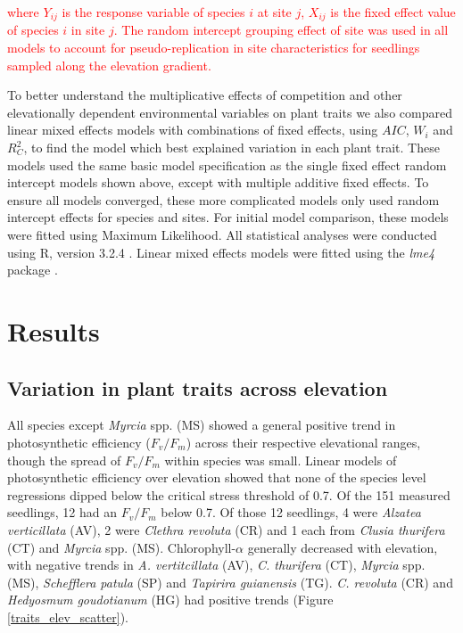 \documentclass[a4paper, 11pt]{article}
\newcommand{\todo}[1]{\textcolor{red}{#1}}   %
\begin{document}
\todo{where $Y_{ij}$ is the response variable of species $i$ at site $j$, $X_{ij}$ is the fixed effect value of species $i$ in site $j$. The random intercept grouping effect of site was used in all models to account for pseudo-replication in site characteristics for seedlings sampled along the elevation gradient.}

To better understand the multiplicative effects of competition and other elevationally dependent environmental variables on plant traits we also compared linear mixed effects models with combinations of fixed effects, using $AIC$, $W_i$ and $R_C^2$, to find the model which best explained variation in each plant trait. These models used the same basic model specification as the single fixed effect random intercept models shown above, except with multiple additive fixed effects. To ensure all models converged, these more complicated models only used random intercept effects for species and sites. For initial model comparison, these models were fitted using Maximum Likelihood. All statistical analyses were conducted using R, version 3.2.4 \citep{R2019}. Linear mixed effects models were fitted using the \textit{lme4} package \citep{Bates2015}.

\section{Results}

\subsection{Variation in plant traits across elevation}

All species except \textit{Myrcia} spp. (MS) showed a general positive trend in photosynthetic efficiency ($F_v/F_m$) across their respective elevational ranges, though the spread of $F_v/F_m$ within species was small. Linear models of photosynthetic efficiency over elevation showed that none of the species level regressions dipped below the critical stress threshold of 0.7. Of the 151 measured seedlings, 12 had an $F_v/F_m$ below 0.7. Of those 12 seedlings, 4 were \textit{Alzatea verticillata} (AV), 2 were  \textit{Clethra revoluta} (CR) and 1 each from \textit{Clusia thurifera} (CT) and \textit{Myrcia} spp. (MS). Chlorophyll-$\alpha$ generally decreased with elevation, with negative trends in \textit{A. vertitcillata} (AV), \textit{C. thurifera} (CT), \textit{Myrcia} spp. (MS), \textit{Schefflera patula} (SP) and \textit{Tapirira guianensis} (TG). \textit{C. revoluta} (CR)  and \textit{Hedyosmum goudotianum} (HG) had positive trends (Figure \ref{traits_elev_scatter}). 
\end{document}
